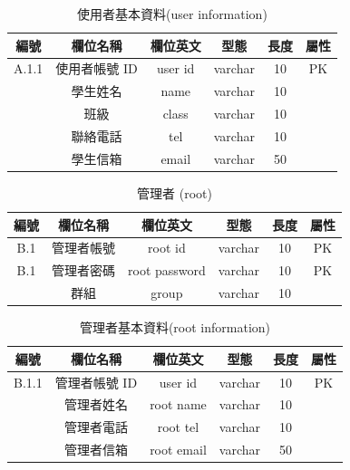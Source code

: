 \begin{table}[H]
\caption{使用者基本資料(user information)}
\label{tab:使用者基本資料}
\renewcommand{\arraystretch}{0.9} %
\arrayrulewidth=0.5pt               %
\centering
\begin{tabular}[t]{|c|c|c|c|c|c|}  %
\hline
編號 & 欄位名稱 & 欄位英文 & 型態 & 長度 & 屬性 \\
\hline
A.1.1 & 使用者帳號 ID & user id & varchar & 10 & PK \\
\hline
& 學生姓名 & name & varchar & 10 & \\
\hline
& 班級 & class & varchar & 10 & \\
\hline
& 聯絡電話 & tel & varchar & 10 & \\
\hline
& 學生信箱 & email & varchar & 50 & \\
\hline
\end{tabular}
\end{table}

\begin{table}[H]
\caption{管理者 (root)}
\label{tab:管理者}
\renewcommand{\arraystretch}{1} %
\arrayrulewidth=0.5pt               %
\centering
\begin{tabular}[t]{|c|c|c|c|c|c|}  %
\hline
編號 & 欄位名稱 & 欄位英文 & 型態 & 長度 & 屬性 \\
\hline
B.1 & 管理者帳號 & root id & varchar & 10 & PK \\
\hline
B.1 & 管理者密碼 & root password & varchar & 10 & PK \\
\hline
& 群組 & group & varchar & 10 & \\
\hline
\end{tabular}
\end{table}

\begin{table}[H]
\caption{管理者基本資料(root information)}
\label{tab:管理者基本資料}
\renewcommand{\arraystretch}{1} %
\arrayrulewidth=0.5pt               %
\centering
\begin{tabular}[t]{|c|c|c|c|c|c|}  %
\hline
編號 & 欄位名稱 & 欄位英文 & 型態 & 長度 & 屬性 \\
\hline
B.1.1 & 管理者帳號 ID & user id & varchar & 10 & PK \\
\hline
& 管理者姓名 & root name & varchar & 10 & \\
\hline
& 管理者電話 & root tel & varchar & 10 & \\
\hline
& 管理者信箱 & root email & varchar & 50 & \\
\hline
\end{tabular}
\end{table}

